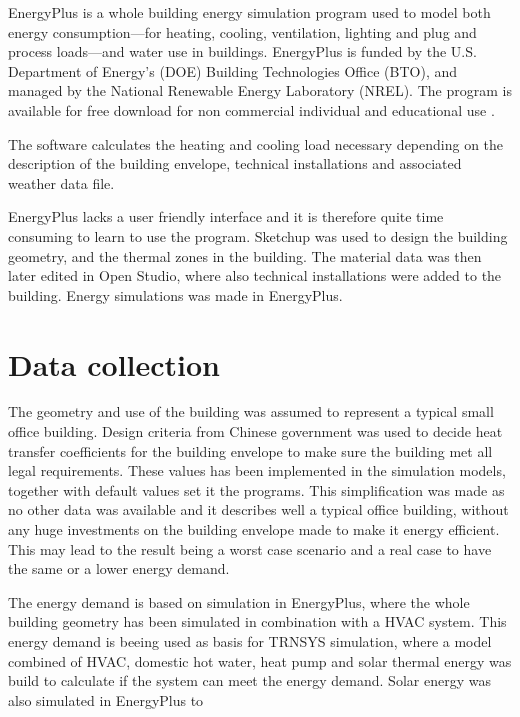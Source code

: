 EnergyPlus is a whole building energy simulation program used to model both energy consumption—for heating, cooling, ventilation, lighting and plug and process loads—and water use in buildings. EnergyPlus is funded by the U.S. Department of Energy’s (DOE) Building Technologies Office (BTO), and managed by the National Renewable Energy Laboratory (NREL). The program is available for free download for non commercial individual and educational use \cite{energyplus}.

The software calculates the heating and cooling load necessary depending on the description of the building envelope, technical installations and associated weather data file. 

EnergyPlus lacks a user friendly interface and it is therefore quite time consuming to learn to use the program. Sketchup was used to design the building geometry, and the thermal zones in the building. The material data was then later edited in Open Studio, where also technical installations were added to the building. Energy simulations was made in EnergyPlus. 

\section{Data collection}
The geometry and use of the building was assumed to represent a typical small office building. Design criteria from Chinese government was used to decide heat transfer coefficients for the building envelope to make sure the building met all legal requirements. These values has been implemented in the simulation models, together with default values set it the programs. This simplification was made as no other data was available and it describes well a typical office building, without any huge investments on the building envelope made to make it energy efficient. This may lead to the result being a worst case scenario and a real case to have the same or a lower energy demand. 

The energy demand is based on simulation in EnergyPlus, where the whole building geometry has been simulated in combination with a HVAC system. This energy demand is beeing used as basis for TRNSYS simulation, where a model combined of HVAC, domestic hot water, heat pump and solar thermal energy was build to calculate if the system can meet the energy demand. Solar energy was also simulated in EnergyPlus to 
